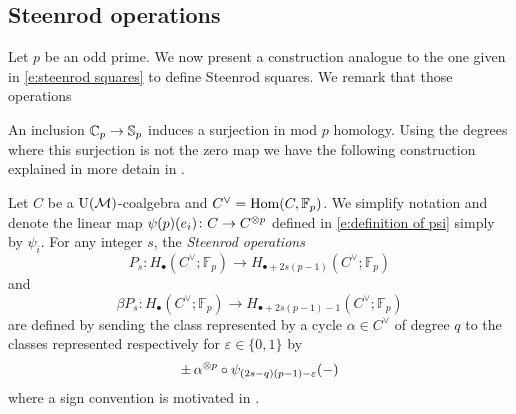 \subsection{Steenrod operations}

Let $p$ be an odd prime.
We now present a construction analogue to the one given in \eqref{e:steenrod squares} to define Steenrod squares.
We remark that those operations

An inclusion $\mathbb{C}_p \to \mathbb{S}_p$ induces a surjection in mod $p$ homology. Using the degrees where this surjection is not the zero map we have the following construction explained in more detain in \cite{steenrod1952reduced,steenrod1953cyclic,may1970general}.

Let $C$ be a ${\operatorname{U}(\mathcal{M})}$-coalgebra and $C^\vee = \mathrm{Hom}(C, {\mathbb{F}_p})$.
We simplify notation and denote the linear map $\psi(p)(e_i) \colon C \to C^{\otimes p}$ defined in \eqref{e:definition of psi} simply by $\psi_i$.
For any integer $s$, the \textit{Steenrod operations}
\begin{equation*}
P_s \colon H_\bullet(C^\vee; \mathbb{F}_p) \to H_{\bullet + 2s(p-1)}(C^\vee; \mathbb{F}_p)
\end{equation*}
and
\begin{equation*}
\beta P_s \colon H_\bullet(C^\vee; \mathbb{F}_p) \to H_{\bullet + 2s(p-1) - 1}(C^\vee; \mathbb{F}_p)
\end{equation*}
are defined by sending the class represented by a cycle $\alpha \in C^\vee$ of degree $q$ to the classes represented respectively for $\varepsilon \in \{0,1\}$ by
\begin{equation*}
\pm \, \alpha^{\otimes p} \circ \psi_{(2s-q)(p-1)-\varepsilon}(-)
\end{equation*}
where a sign convention is motivated in \cite[(6.1)]{steenrod1953cyclic}.

